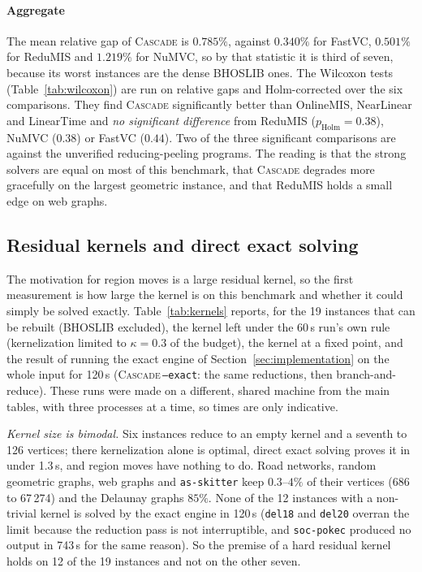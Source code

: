 \documentclass[review,authoryear,11pt]{elsarticle}
\theoremstyle{definition}
\begin{document}
\paragraph{Aggregate} The mean relative gap of \textsc{Cascade} is $0.785\%$, against
$0.340\%$ for FastVC, $0.501\%$ for ReduMIS and $1.219\%$ for NuMVC, so by that
statistic it is third of seven, because its worst instances are the dense BHOSLIB ones.
The Wilcoxon tests (Table~\ref{tab:wilcoxon}) are run on relative gaps and
Holm-corrected over the six comparisons. They find \textsc{Cascade} significantly
better than OnlineMIS, NearLinear and LinearTime and \emph{no significant difference}
from ReduMIS ($p_{\mathrm{Holm}}=0.38$), NuMVC ($0.38$) or FastVC ($0.44$). Two of the
three significant comparisons are against the unverified reducing-peeling programs. The
reading is that the strong solvers are equal on most of this benchmark, that
\textsc{Cascade} degrades more gracefully on the largest geometric instance, and that
ReduMIS holds a small edge on web graphs.

\subsection{Residual kernels and direct exact solving}
\label{sec:kernels}

The motivation for region moves is a large residual kernel, so the first measurement
is how large the kernel is on this benchmark and whether it could simply be solved
exactly. Table~\ref{tab:kernels} reports, for the 19 instances that can be rebuilt
(BHOSLIB excluded), the kernel left under the 60\,s run's own rule (kernelization
limited to $\kappa=0.3$ of the budget), the kernel at a fixed point, and the result of
running the exact engine of Section~\ref{sec:implementation} on the whole input for
120\,s (\textsc{Cascade}\,\texttt{--exact}: the same reductions, then
branch-and-reduce). These runs were made on a different, shared machine from the main
tables, with three processes at a time, so times are only indicative.



\emph{Kernel size is bimodal.} Six instances reduce to an empty kernel and a seventh to
126 vertices; there kernelization alone is optimal, direct exact solving proves it in
under 1.3\,s, and region moves have nothing to do. Road networks, random geometric
graphs, web graphs and \texttt{as-skitter} keep $0.3$--$4\%$ of their vertices (686 to
67\,274) and the Delaunay graphs $85\%$. None of the 12 instances with a non-trivial
kernel is solved by the exact engine in 120\,s (\texttt{del18} and \texttt{del20}
overran the limit because the reduction pass is not interruptible, and \texttt{soc-pokec}
produced no output in 743\,s for the same reason). So the premise of a hard residual
kernel holds on 12 of the 19 instances and not on the other seven.
\end{document}
